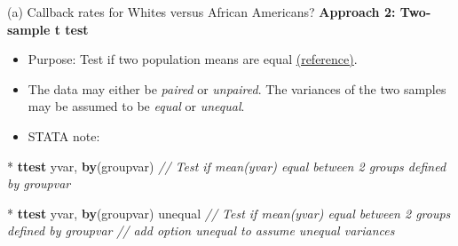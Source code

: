 \documentclass[
  10pt,
  ignorenonframetext,
]{beamer}
\newenvironment{Shaded}{\begin{snugshade}}{\end{snugshade}}
\newcommand{\CommentTok}[1]{\textcolor[rgb]{0.56,0.35,0.01}{\textit{#1}}}
\newcommand{\KeywordTok}[1]{\textcolor[rgb]{0.13,0.29,0.53}{\textbf{#1}}}
\newcommand{\NormalTok}[1]{#1}
\providecommand{\tightlist}{%
  \setlength{\itemsep}{0pt}\setlength{\parskip}{0pt}}
\begin{document}
\begin{frame}[fragile]{(a) Callback rates for Whites versus African
Americans?}
\protect\hypertarget{a-callback-rates-for-whites-versus-african-americans-2}{}
\textbf{Approach 2: Two-sample t test}

\begin{itemize}
\tightlist
\item
  Purpose: Test if two population means are equal
  \href{https://www.itl.nist.gov/div898/handbook/eda/section3/eda353.htm}{(reference)}.
\item
  The data may either be \emph{paired} or \emph{unpaired}. The variances
  of the two samples may be assumed to be \emph{equal} or
  \emph{unequal}.
\end{itemize}

\vspace{2mm}

\begin{itemize}
\tightlist
\item
  STATA note:
\end{itemize}

\footnotesize

\begin{Shaded}
\begin{Highlighting}[]
\NormalTok{* }\KeywordTok{ttest}\NormalTok{ yvar, }\KeywordTok{by}\NormalTok{(groupvar)}
\CommentTok{// Test if mean(yvar) equal between 2 groups defined by groupvar}
\end{Highlighting}
\end{Shaded}

\begin{Shaded}
\begin{Highlighting}[]
\NormalTok{* }\KeywordTok{ttest}\NormalTok{ yvar, }\KeywordTok{by}\NormalTok{(groupvar) unequal}
\CommentTok{// Test if mean(yvar) equal between 2 groups defined by groupvar}
\CommentTok{// add option \textquotesingle{}unequal\textquotesingle{} to assume unequal variances}
\end{Highlighting}
\end{Shaded}
\end{frame}
\end{document}
